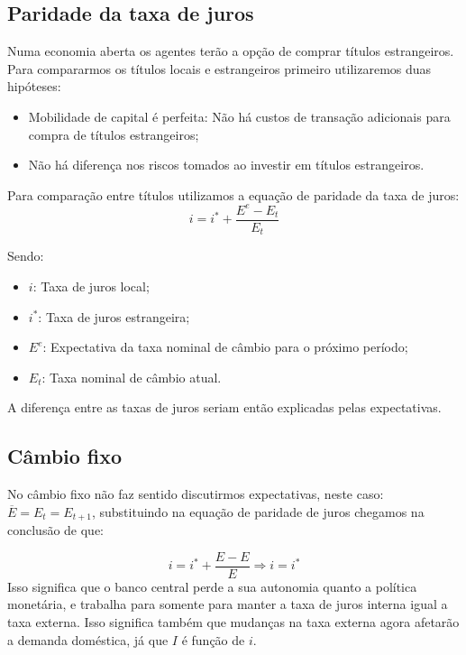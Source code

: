 \documentclass[12pt,a4paper,oneside,brazil]{abntex2}
\begin{document}
\subsection{Paridade da taxa de juros}
Numa economia aberta os agentes terão a opção de comprar títulos estrangeiros. Para compararmos os títulos locais e estrangeiros primeiro utilizaremos duas hipóteses:
\begin{itemize}
\item Mobilidade de capital é perfeita: Não há custos de transação adicionais para compra de títulos estrangeiros;
\item Não há diferença nos riscos tomados ao investir em títulos estrangeiros.
\end{itemize}
Para comparação entre títulos utilizamos a equação de paridade da taxa de juros:
\[ i = i^* + \frac{E^e - E_t}{E_t} \]

Sendo: 
\begin{itemize}
\item $i$: Taxa de juros local;
\item $i^*$: Taxa de juros estrangeira;
\item $E^e$: Expectativa da taxa nominal de câmbio para o próximo período;
\item $E_t$: Taxa nominal de câmbio atual.
\end{itemize}

A diferença entre as taxas de juros seriam então explicadas pelas expectativas.
\subsection{Câmbio fixo}
No câmbio fixo não faz sentido discutirmos expectativas, neste caso: $ \overline{E} = E_{t} = E_{t+1}$, substituindo na equação de paridade de juros chegamos na conclusão de que:

\begin{equation}\label{Fixo}
i = i^{*} + \frac{E - E}{E} \Rightarrow  i = i^{*}
\end{equation}
Isso significa que o banco central perde a sua autonomia quanto a política monetária, e trabalha para somente para manter a taxa de juros interna igual a taxa externa. Isso significa também que mudanças na taxa externa agora afetarão a demanda doméstica, já que $I$ é função de $i$.
\end{document}
